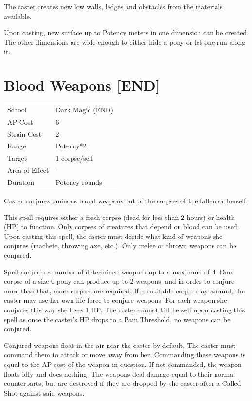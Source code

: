 \documentclass[11pt,a4paper,twocolumn]{book}
\begin{document}
The caster creates new low walls, ledges and obstacles from the materials available.

Upon casting, new surface up to Potency meters in one dimension can be created. The other dimensions are wide enough to either hide a pony or let one run along it.


\section*{Blood Weapons [END]}
{
	\begin{tabu} to 75mm{| X[l,4] | X[l,7] |}
		\hline
		School 			& Dark Magic (END) 		\\
        AP Cost	      	& 6 					\\
        Strain Cost     & 2 					\\
        Range     		& Potency*2				\\
        Target      	& 1 corpse/self 		\\
        Area of Effect  & - 	 				\\
        Duration     	& Potency rounds 		\\ \hline
	\end{tabu}
		
}

\medskip

Caster conjures ominous blood weapons out of the corpses of the fallen or herself.

This spell requires either a fresh corpse (dead for less than 2 hours) or health (HP) to function. Only corpses of creatures that depend on blood can be used. Upon casting this spell, the caster must decide what kind of weapons she conjures (machete, throwing axe, etc.). Only melee or thrown weapons can be conjured.

Spell conjures a number of determined weapons up to a maximum of 4. One corpse of a size 0 pony can produce up to 2 weapons, and in order to conjure more than that, more corpses are required. If no suitable corpses lay around, the caster may use her own life force to conjure weapons. For each weapon she conjures this way she loses 1 HP. The caster cannot kill herself upon casting this spell as once the caster's HP drops to a Pain Threshold, no weapons can be conjured.

Conjured weapons float in the air near the caster by default. The caster must command them to attack or move away from her. Commanding these weapons is equal to the AP cost of the weapon in question. If not commanded, the weapon floats idly and does nothing. The weapons deal damage equal to their normal counterparts, but are destroyed if they are dropped by the caster after a Called Shot against said weapons.
\end{document}
